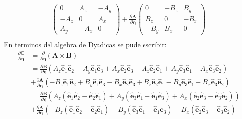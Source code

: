 \documentclass[a4paper]{article}
\begin{document}
\begin{answer}[Punto 23]
\begin{align*}
\begin{pmatrix}
            0 & A_z & -A_y\\
            -A_z & 0 & A_x\\
            A_y& -A_x & 0
        \end{pmatrix}    +  \frac{\partial \mathbf A}{\partial \pmb \eta}\begin{pmatrix}
            0 & -B_z & B_y\\
            B_z & 0 & -B_x\\
            -B_y & B_x & 0
        \end{pmatrix}\\
        \end{align*}
        En terminos del algebra de Dyadicas se pude escribir:
        \begin{align*}
                \frac{\partial \mathbf C}{\partial \pmb \eta} &= \frac{\partial}{\partial \pmb \eta}(\mathbf A \times \mathbf B)\\
                &= \frac{\partial \mathbf B}{\partial \pmb \eta} \left(
                    A_z \mathbf {\hat e}_1 \mathbf {\hat e}_2 - A_y \mathbf {\hat e}_1 \mathbf {\hat e}_3 + A_x \mathbf {\hat e}_2 \mathbf {\hat e}_3 
                    - A_z \mathbf {\hat e}_2 \mathbf {\hat e}_1 + A_y \mathbf {\hat e}_3 \mathbf {\hat e}_1 - A_x \mathbf {\hat e}_3 \mathbf {\hat e}_2
                \right) \\
                &+ \frac{\partial \mathbf A}{\partial \pmb \eta} \left(
                    -B_z \mathbf {\hat e}_1 \mathbf {\hat e}_2 + B_y \mathbf {\hat e}_1 \mathbf {\hat e}_3 - B_x \mathbf {\hat e}_2 \mathbf {\hat e}_3
                    + B_z \mathbf {\hat e}_2 \mathbf {\hat e}_1 - B_y \mathbf {\hat e}_3 \mathbf {\hat e}_1 + B_x \mathbf {\hat e}_3 \mathbf {\hat e}_2
                \right)\\
                &= \frac{\partial \mathbf B}{\partial \pmb \eta} \left(
                    A_z\left(\mathbf {\hat e}_1 \mathbf {\hat e}_2 - \mathbf {\hat e}_2 \mathbf {\hat e}_1\right) + A_y\left(\mathbf {\hat e}_3 \mathbf {\hat e}_1 - \mathbf {\hat e}_1 \mathbf {\hat e}_3\right) + A_x\left(\mathbf {\hat e}_2 \mathbf {\hat e}_3 - \mathbf {\hat e}_3 \mathbf {\hat e}_2\right)
                \right)\\
                &+ \frac{\partial \mathbf A}{\partial \pmb \eta} \left(
                    -B_z\left(\mathbf {\hat e}_1 \mathbf {\hat e}_2 - \mathbf {\hat e}_2 \mathbf {\hat e}_1\right) - B_y\left(\mathbf {\hat e}_3 \mathbf {\hat e}_1 - \mathbf {\hat e}_1 \mathbf {\hat e}_3\right) - B_x\left(\mathbf {\hat e}_2 \mathbf {\hat e}_3 - \mathbf {\hat e}_3 \mathbf {\hat e}_2\right)

\end{align*}
\end{answer}
\end{document}
